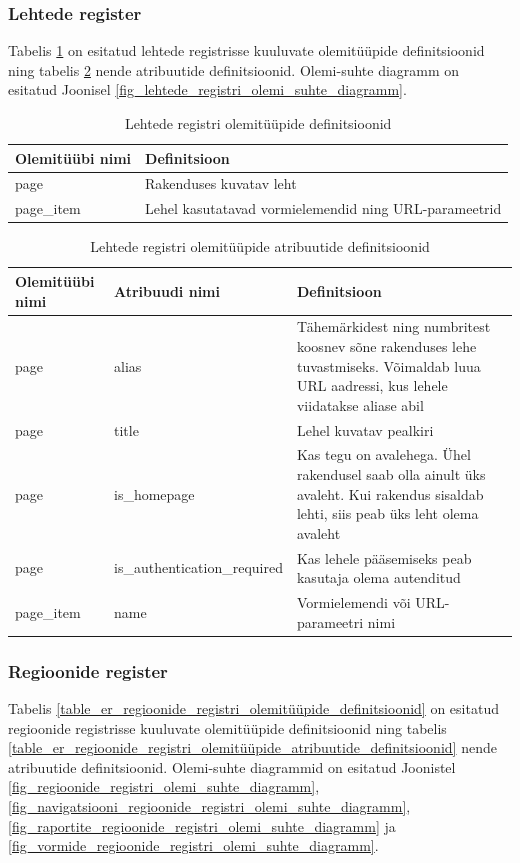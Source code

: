 \documentclass[a4paper,12pt]{article} %
\begin{document}
\subsubsection{Lehtede register}
Tabelis \ref{table_er_lehtede_registri_olemitüüpide_definitsioonid} on esitatud lehtede registrisse kuuluvate olemitüüpide definitsioonid ning tabelis \ref{table_er_lehtede_registri_olemitüüpide_atribuutide_definitsioonid} nende atribuutide definitsioonid. Olemi-suhte diagramm on esitatud Joonisel \ref{fig_lehtede_registri_olemi_suhte_diagramm}.

\begin{table}[H]
\centering
\caption{Lehtede registri olemitüüpide definitsioonid}
\label{table_er_lehtede_registri_olemitüüpide_definitsioonid}
\begin{tabular}{|p{4cm}|p{11cm}|}
\hline
\rowcolor{rowgray}
Olemitüübi nimi & Definitsioon \\ \hline
page & Rakenduses kuvatav leht \\ \hline
page\_item & Lehel kasutatavad vormielemendid ning URL-parameetrid \\ \hline
\end{tabular}
\end{table}

\begin{table}[H]
\centering
\caption{Lehtede registri olemitüüpide atribuutide definitsioonid}
\label{table_er_lehtede_registri_olemitüüpide_atribuutide_definitsioonid}
\begin{tabular}{|p{4cm}|p{5cm}|p{6cm}|}
\hline
\rowcolor{rowgray}
Olemitüübi nimi & Atribuudi nimi & Definitsioon \\ \hline
page & alias & Tähemärkidest ning numbritest koosnev sõne rakenduses lehe tuvastmiseks. Võimaldab luua URL aadressi, kus lehele viidatakse aliase abil \\ \hline
page & title & Lehel kuvatav pealkiri \\ \hline
page & is\_homepage & Kas tegu on avalehega. Ühel rakendusel saab olla ainult üks avaleht. Kui rakendus sisaldab lehti, siis peab üks leht olema avaleht \\ \hline
page & is\_authentication\_required & Kas lehele pääsemiseks peab kasutaja olema autenditud \\ \hline
page\_item & name  & Vormielemendi või URL-parameetri nimi \\ \hline
\end{tabular}
\end{table}

\subsubsection{Regioonide register}
Tabelis \ref{table_er_regioonide_registri_olemitüüpide_definitsioonid} on esitatud regioonide registrisse kuuluvate olemitüüpide definitsioonid ning tabelis \ref{table_er_regioonide_registri_olemitüüpide_atribuutide_definitsioonid} nende atribuutide definitsioonid. Olemi-suhte diagrammid on esitatud Joonistel \ref{fig_regioonide_registri_olemi_suhte_diagramm}, \ref{fig_navigatsiooni_regioonide_registri_olemi_suhte_diagramm}, \ref{fig_raportite_regioonide_registri_olemi_suhte_diagramm} ja \ref{fig_vormide_regioonide_registri_olemi_suhte_diagramm}.
\end{document}
